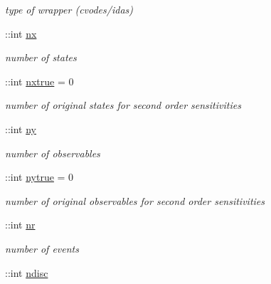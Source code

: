 \begin{DoxyCompactItemize}
\begin{DoxyCompactList}\small\item\em type of wrapper (cvodes/idas) \end{DoxyCompactList}\item 
\hypertarget{classamimodel_a84e4236f07668a770c27567f1f9615ff}{}\+::int \hyperlink{classamimodel_a84e4236f07668a770c27567f1f9615ff}{nx}\label{classamimodel_a84e4236f07668a770c27567f1f9615ff}

\begin{DoxyCompactList}\small\item\em number of states \end{DoxyCompactList}\item 
\+::int \hyperlink{classamimodel_a49c476de14a021114feb8c95da04952a}{nxtrue} = 0
\begin{DoxyCompactList}\small\item\em number of original states for second order sensitivities \end{DoxyCompactList}\item 
\hypertarget{classamimodel_a289ca425eb368f1d582b6be2be0d3dfc}{}\+::int \hyperlink{classamimodel_a289ca425eb368f1d582b6be2be0d3dfc}{ny}\label{classamimodel_a289ca425eb368f1d582b6be2be0d3dfc}

\begin{DoxyCompactList}\small\item\em number of observables \end{DoxyCompactList}\item 
\+::int \hyperlink{classamimodel_ac91d7b36031ec122abc9f739692b02e8}{nytrue} = 0
\begin{DoxyCompactList}\small\item\em number of original observables for second order sensitivities \end{DoxyCompactList}\item 
\hypertarget{classamimodel_a70c1a5f25e12e70da97faf350ec11f8b}{}\+::int \hyperlink{classamimodel_a70c1a5f25e12e70da97faf350ec11f8b}{nr}\label{classamimodel_a70c1a5f25e12e70da97faf350ec11f8b}

\begin{DoxyCompactList}\small\item\em number of events \end{DoxyCompactList}\item 
\hypertarget{classamimodel_a2a7bdf803572325913e90e19189051d4}{}\+::int \hyperlink{classamimodel_a2a7bdf803572325913e90e19189051d4}{ndisc}\label{classamimodel_a2a7bdf803572325913e90e19189051d4}


\end{DoxyCompactItemize}
